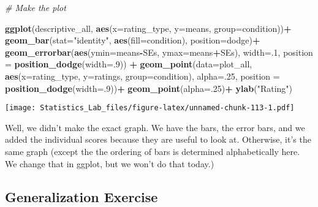 \documentclass[
]{book}
\newenvironment{Shaded}{\begin{snugshade}}{\end{snugshade}}
\newcommand{\AttributeTok}[1]{\textcolor[rgb]{0.13,0.29,0.53}{#1}}
\newcommand{\CommentTok}[1]{\textcolor[rgb]{0.56,0.35,0.01}{\textit{#1}}}
\newcommand{\DecValTok}[1]{\textcolor[rgb]{0.00,0.00,0.81}{#1}}
\newcommand{\FunctionTok}[1]{\textcolor[rgb]{0.13,0.29,0.53}{\textbf{#1}}}
\newcommand{\NormalTok}[1]{#1}
\newcommand{\SpecialCharTok}[1]{\textcolor[rgb]{0.81,0.36,0.00}{\textbf{#1}}}
\newcommand{\StringTok}[1]{\textcolor[rgb]{0.31,0.60,0.02}{#1}}
\begin{document}
\begin{Shaded}
\begin{Highlighting}[]
\CommentTok{\# Make the plot}

\FunctionTok{ggplot}\NormalTok{(descriptive\_all, }\FunctionTok{aes}\NormalTok{(}\AttributeTok{x=}\NormalTok{rating\_type, }\AttributeTok{y=}\NormalTok{means, }\AttributeTok{group=}\NormalTok{condition))}\SpecialCharTok{+} 
  \FunctionTok{geom\_bar}\NormalTok{(}\AttributeTok{stat=}\StringTok{"identity"}\NormalTok{, }\FunctionTok{aes}\NormalTok{(}\AttributeTok{fill=}\NormalTok{condition), }\AttributeTok{position=}\StringTok{\textquotesingle{}dodge\textquotesingle{}}\NormalTok{)}\SpecialCharTok{+} 
  \FunctionTok{geom\_errorbar}\NormalTok{(}\FunctionTok{aes}\NormalTok{(}\AttributeTok{ymin=}\NormalTok{means}\SpecialCharTok{{-}}\NormalTok{SEs,               }
                    \AttributeTok{ymax=}\NormalTok{means}\SpecialCharTok{+}\NormalTok{SEs), }
                \AttributeTok{width=}\NormalTok{.}\DecValTok{1}\NormalTok{, }
                \AttributeTok{position =} \FunctionTok{position\_dodge}\NormalTok{(}\AttributeTok{width=}\NormalTok{.}\DecValTok{9}\NormalTok{)) }\SpecialCharTok{+}
  \FunctionTok{geom\_point}\NormalTok{(}\AttributeTok{data=}\NormalTok{plot\_all, }\FunctionTok{aes}\NormalTok{(}\AttributeTok{x=}\NormalTok{rating\_type, }
                                \AttributeTok{y=}\NormalTok{ratings, }
                                \AttributeTok{group=}\NormalTok{condition), }
             \AttributeTok{alpha=}\NormalTok{.}\DecValTok{25}\NormalTok{, }
             \AttributeTok{position =} \FunctionTok{position\_dodge}\NormalTok{(}\AttributeTok{width=}\NormalTok{.}\DecValTok{9}\NormalTok{))}\SpecialCharTok{+}
  \FunctionTok{geom\_point}\NormalTok{(}\AttributeTok{alpha=}\NormalTok{.}\DecValTok{25}\NormalTok{)}\SpecialCharTok{+}
  \FunctionTok{ylab}\NormalTok{(}\StringTok{"Rating"}\NormalTok{)}
\end{Highlighting}
\end{Shaded}

\texttt{[image: Statistics\_Lab\_files/figure-latex/unnamed-chunk-113-1.pdf]}

Well, we didn't make the exact graph. We have the bars, the error bars, and we added the individual scores because they are useful to look at. Otherwise, it's the same graph (except the the ordering of bars is determined alphabetically here. We change that in ggplot, but we won't do that today.)

\hypertarget{generalization-exercise-6}{%
\subsection{Generalization Exercise}\label{generalization-exercise-6}}
\end{document}
